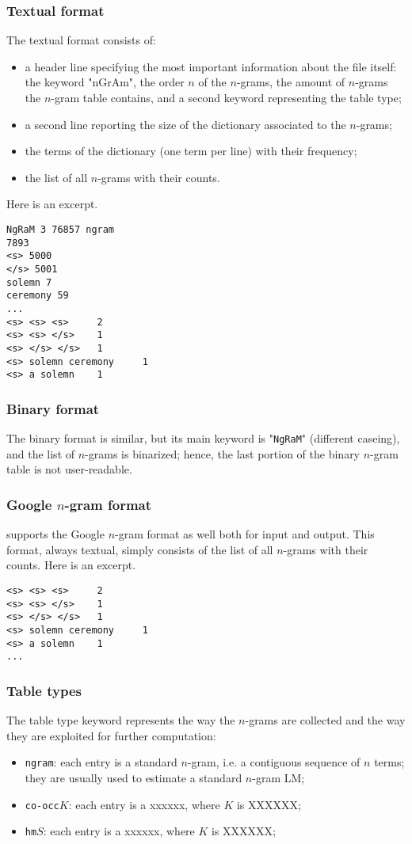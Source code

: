 \subsubsection{Textual format}
The textual format consists of:
\begin{itemize}
\item a header line specifying the most important information about the file itself: the keyword "nGrAm", the order $n$ of the $n$-grams, the amount of $n$-grams the $n$-gram table contains, and a second keyword representing the table type;
\item a second line reporting the size of the dictionary associated to the $n$-grams;
\item the terms of the dictionary (one term per line) with their frequency;
\item the list of all $n$-grams with their counts.
\end{itemize}
Here is an excerpt.
\begin{verbatim}
NgRaM 3 76857 ngram
7893
<s> 5000
</s> 5001
solemn 7
ceremony 59
...
<s> <s> <s>     2
<s> <s> </s>    1
<s> </s> </s>   1
<s> solemn ceremony     1
<s> a solemn    1
\end{verbatim}

\subsubsection{Binary format}
The binary format is similar, but its main keyword is "{\tt NgRaM}" (different caseing), and the list of $n$-grams is binarized; hence, the last portion of the binary $n$-gram table is not user-readable.

\subsubsection{Google $n$-gram format}
{\IRSTLM} supports the Google $n$-gram format as well both for input and output. This format, always textual, simply consists of the list of all $n$-grams with their counts.
Here is an excerpt.
\begin{verbatim}
<s> <s> <s>     2
<s> <s> </s>    1
<s> </s> </s>   1
<s> solemn ceremony     1
<s> a solemn    1
...
\end{verbatim}




\subsubsection{Table types}
The table type keyword represents the way the $n$-grams are collected and the way they are exploited for further computation:
\begin{itemize}
\item{\tt ngram}: each entry is a standard $n$-gram, i.e. a contiguous sequence of $n$ terms; they are usually used to estimate a standard $n$-gram LM;
\item{\tt co-occ$K$}: each entry is a xxxxxx, where $K$ is XXXXXX;
\item{\tt hm$S$}: each entry is a xxxxxx, where $K$ is XXXXXX;
\end{itemize}

